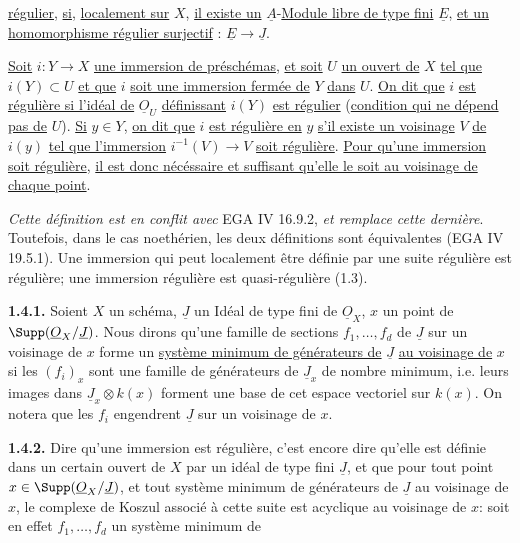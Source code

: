 
\uline{régulier}, \uline{si}, \uline{localement sur} $X$, \uline{il existe un} $\underline{A}$-\uline{Module libre de type fini} $\underline{E}$, \uline{et un homomorphisme régulier surjectif} : $\underline{E}\longrightarrow \underline{J}$.

\uline{Soit} $i:Y\longrightarrow X$ \uline{une immersion de préschémas}, \uline{et soit} $U$ \uline{un ouvert de} $X$ \uline{tel que} $i(Y)\subset U$ \uline{et que} $i$ \uline{soit une immersion fermée de} $Y$ \uline{dans} $U$. \uline{On dit que} $i$ \uline{est régulière si l'idéal de} $\underline{O}_U$ \uline{définissant} $i(Y)$ \uline{est régulier} (\uline{condition qui ne dépend pas de} $U$). \uline{Si} $y\in Y$, \uline{on dit que} $i$ \uline{est régulière en} $y$ \uline{s'il existe un voisinage} $V$ \uline{de} $i(y)$ \uline{tel que l'immersion} $i^{-1}(V)\longrightarrow V$ \uline{soit régulière}. \uline{Pour qu'une immersion soit régulière}, \uline{il est donc nécéssaire et suffisant qu'elle le soit au voisinage de chaque point}.

\emph{Cette définition est en conflit avec} EGA IV 16.9.2, \emph{et remplace cette dernière}. Toutefois, dans le cas noethérien, les deux définitions sont équivalentes (EGA IV 19.5.1). Une immersion qui peut localement être définie par une suite régulière est régulière; une immersion régulière est quasi-régulière (1.3).

\textbf{1.4.1.} Soient $X$ un schéma, $\underline{J}$ un Idéal de type fini de $\underline{O}_X$, $x$ un point de $\Supp(\underline{O}_X/\underline{J})$. Nous dirons qu'une famille de sections $f_1,\ldots,f_d$ de $\underline{J}$ sur un voisinage de $x$ forme un \uline{système minimum de générateurs de} $\underline{J}$ \uline{au voisinage de} $x$ si les $(f_i)_x$ sont une famille de générateurs de $\underline{J}_x$ de nombre minimum, i.e. leurs images dans $\underline{J}_x\otimes k(x)$ forment une base de cet espace vectoriel sur $k(x)$. On notera que les $f_i$ engendrent $\underline{J}$ sur un voisinage de $x$.

\textbf{1.4.2.} Dire qu'une immersion est régulière, c'est encore dire qu'elle est définie dans un certain ouvert de $X$ par un idéal de type fini $\underline{J}$, et que pour tout point $x\in\Supp(\underline{O}_X/\underline{J})$, et tout système minimum de générateurs de $\underline{J}$ au voisinage de $x$, le complexe de Koszul associé à cette suite est acyclique au voisinage de $x$: soit en effet $f_1,\ldots,f_d$ un système minimum de
